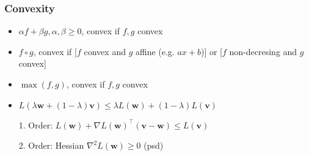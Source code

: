 \documentclass[a4paper,11pt]{article}
\begin{document}
\subsubsection*{Convexity}
\begin{itemize}
	\item $\alpha f+\beta g, \alpha, \beta \geq 0$, convex if $f, g$ convex
	\item $f \circ g$, convex if [$f$ convex and $g$ affine (e.g. $a x+b$)] or [$f$ non-decresing and $g$ convex]
	\item $\max(f, g)$, convex if $f, g$ convex
	\item $L(\lambda \mathbf{w}+(1-\lambda) \mathbf{v}) \leq \lambda L(\mathbf{w})+(1-\lambda) L(\mathbf{v})$
\end{itemize}
\begin{enumerate}
\item[1.] Order: $L(\mathbf{w})+\nabla L(\mathbf{w})^{\top}(\mathbf{v}-\mathbf{w}) \leq L(\mathbf{v})$
\item[2.] Order: Hessian $\nabla^2 L(\mathbf{w}) \geq 0$ (psd)
\end{enumerate}
\end{document}
